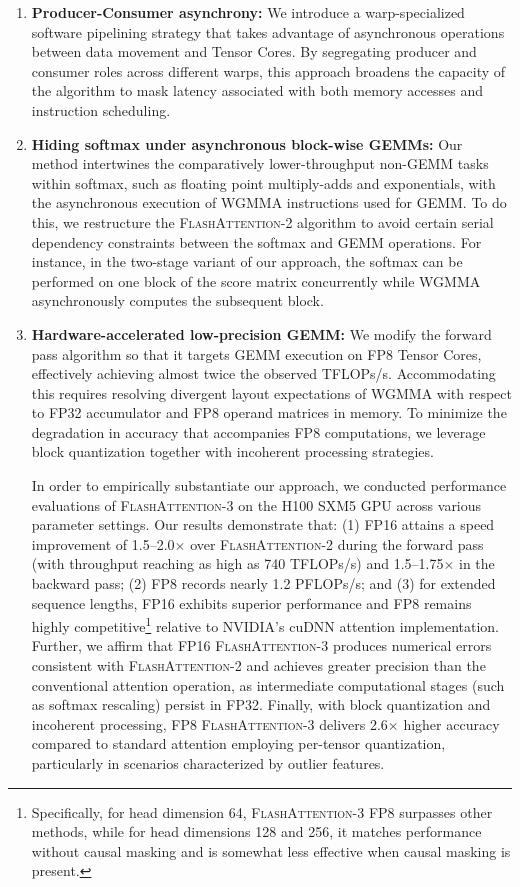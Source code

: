 \begin{enumerate}

\item \textbf{Producer-Consumer asynchrony:} We introduce a warp-specialized software pipelining strategy that takes advantage of asynchronous operations between data movement and Tensor Cores. By segregating producer and consumer roles across different warps, this approach broadens the capacity of the algorithm to mask latency associated with both memory accesses and instruction scheduling.

\item \textbf{Hiding softmax under asynchronous block-wise GEMMs:} Our method intertwines the comparatively lower-throughput non-GEMM tasks within softmax, such as floating point multiply-adds and exponentials, with the asynchronous execution of WGMMA instructions used for GEMM. To do this, we restructure the \textsc{FlashAttention-2} algorithm to avoid certain serial dependency constraints between the softmax and GEMM operations. For instance, in the two-stage variant of our approach, the softmax can be performed on one block of the score matrix concurrently while WGMMA asynchronously computes the subsequent block.

\item \textbf{Hardware-accelerated low-precision GEMM:} We modify the forward pass algorithm so that it targets GEMM execution on FP8 Tensor Cores, effectively achieving almost twice the observed TFLOPs/s. Accommodating this requires resolving divergent layout expectations of WGMMA with respect to FP32 accumulator and FP8 operand matrices in memory. To minimize the degradation in accuracy that accompanies FP8 computations, we leverage block quantization together with incoherent processing strategies.

In order to empirically substantiate our approach, we conducted performance evaluations of \textsc{FlashAttention-3} on the H100 SXM5 GPU across various parameter settings. Our results demonstrate that: (1) FP16 attains a speed improvement of 1.5--2.0$\times$ over \textsc{FlashAttention-2} during the forward pass (with throughput reaching as high as 740 TFLOPs/s) and 1.5--1.75$\times$ in the backward pass; (2) FP8 records nearly 1.2 PFLOPs/s; and (3) for extended sequence lengths, FP16 exhibits superior performance and FP8 remains highly competitive\footnote{Specifically, for head dimension 64, \textsc{FlashAttention-3} FP8 surpasses other methods, while for head dimensions 128 and 256, it matches performance without causal masking and is somewhat less effective when causal masking is present.} relative to NVIDIA’s cuDNN attention implementation. Further, we affirm that FP16 \textsc{FlashAttention-3} produces numerical errors consistent with \textsc{FlashAttention-2} and achieves greater precision than the conventional attention operation, as intermediate computational stages (such as softmax rescaling) persist in FP32. Finally, with block quantization and incoherent processing, FP8 \textsc{FlashAttention-3} delivers 2.6$\times$ higher accuracy compared to standard attention employing per-tensor quantization, particularly in scenarios characterized by outlier features.


\end{enumerate}
